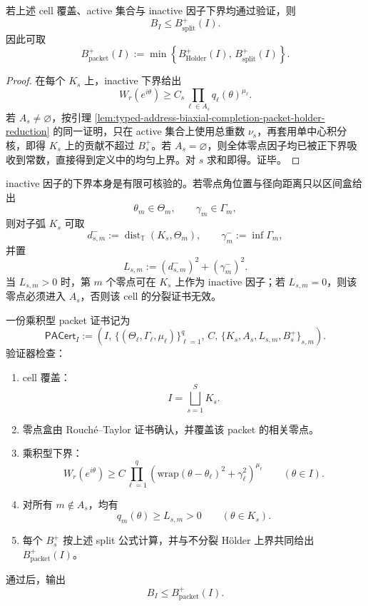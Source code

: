 \begin{proposition}\label{prop:typed-address-biaxial-completion-split-packet-bound}
若上述 cell 覆盖、active 集合与 inactive 因子下界均通过验证，则
\[
B_I\le B_{\mathrm{split}}^+(I).
\]
因此可取
\[
B_{\mathrm{packet}}^+(I)
:=
\min\left\{
B_{\mathrm{Holder}}^+(I),\,
B_{\mathrm{split}}^+(I)
\right\}.
\]
\end{proposition}
\begin{proof}
在每个 \(K_s\) 上，inactive 下界给出
\[
W_r(e^{i\theta})
\ge
C_s\prod_{\ell\in A_s}q_\ell(\theta)^{\mu_\ell}.
\]
若 \(A_s\ne\varnothing\)，按引理 \ref{lem:typed-address-biaxial-completion-packet-holder-reduction} 的同一证明，只在 active 集合上使用总重数 \(\nu_s\)，再套用单中心积分核，即得 \(K_s\) 上的贡献不超过 \(B_s^+\)。若 \(A_s=\varnothing\)，则全体零点因子均已被正下界吸收到常数，直接得到定义中的均匀上界。对 \(s\) 求和即得。证毕。
\end{proof}

inactive 因子的下界本身是有限可核验的。若零点角位置与径向距离只以区间盒给出
\[
\theta_m\in\Theta_m,
\qquad
\gamma_m\in\Gamma_m,
\]
则对子弧 \(K_s\) 可取
\[
d_{s,m}^-:=\operatorname{dist}_{\mathbb T}(K_s,\Theta_m),
\qquad
\gamma_m^-:=\inf\Gamma_m,
\]
并置
\[
L_{s,m}:=(d_{s,m}^-)^2+(\gamma_m^-)^2.
\]
当 \(L_{s,m}>0\) 时，第 \(m\) 个零点可在 \(K_s\) 上作为 inactive 因子；若 \(L_{s,m}=0\)，则该零点必须进入 \(A_s\)，否则该 cell 的分裂证书无效。

\begin{definition}\label{def:typed-address-biaxial-completion-packet-aware-regularization-certificate}
一份乘积型 packet 证书记为
\[
\mathsf{PACert}_{I}
:=
\left(
I,\,
\{(\Theta_\ell,\Gamma_\ell,\mu_\ell)\}_{\ell=1}^q,\,
C,\,
\{K_s,A_s,L_{s,m},B_s^+\}_{s,m}
\right).
\]
验证器检查：
\begin{enumerate}
  \item cell 覆盖：
  \[
  I=\bigsqcup_{s=1}^S K_s.
  \]
  \item 零点盒由 Rouch\'e--Taylor 证书确认，并覆盖该 packet 的相关零点。
  \item 乘积型下界：
  \[
  W_r(e^{i\theta})
  \ge
  C
  \prod_{\ell=1}^q
  \left(
  \mathrm{wrap}(\theta-\theta_\ell)^2+\gamma_\ell^2
  \right)^{\mu_\ell}
  \qquad(\theta\in I).
  \]
  \item 对所有 \(m\notin A_s\)，均有
  \[
  q_m(\theta)\ge L_{s,m}>0
  \qquad(\theta\in K_s).
  \]
  \item 每个 \(B_s^+\) 按上述 split 公式计算，并与不分裂 Hölder 上界共同给出
  \(B_{\mathrm{packet}}^+(I)\)。
\end{enumerate}
通过后，输出
\[
B_I\le B_{\mathrm{packet}}^+(I).
\]
\end{definition}

